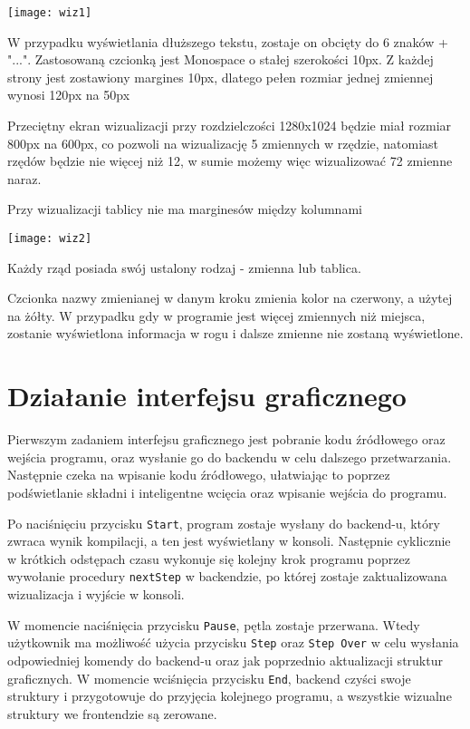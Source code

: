 \documentclass[a4paper,twoside,openright,11pt]{report}
\begin{document}
\begin{center}
  \texttt{[image: wiz1]}
\end{center}

\par W przypadku wyświetlania dłuższego tekstu, zostaje on obcięty do 6 znaków + "...".
Zastosowaną czcionką jest Monospace o stałej szerokości 10px. Z każdej strony jest zostawiony margines 10px, dlatego pełen rozmiar jednej zmiennej wynosi 120px na 50px 
\par Przeciętny ekran wizualizacji przy rozdzielczości 1280x1024 będzie miał rozmiar 800px na 600px, co pozwoli na wizualizację 5 zmiennych w rzędzie, natomiast rzędów będzie nie więcej niż 12, w sumie możemy więc wizualizować 72 zmienne naraz. 
\par Przy wizualizacji tablicy nie ma marginesów między kolumnami 

\begin{center}
  \texttt{[image: wiz2]}
\end{center}

\par Każdy rząd posiada swój ustalony rodzaj - zmienna lub tablica.
\par Czcionka nazwy zmienianej w danym kroku zmienia kolor na czerwony, a użytej na żółty. W przypadku gdy w programie jest więcej zmiennych niż miejsca, zostanie wyświetlona informacja w rogu i dalsze zmienne nie zostaną wyświetlone.

  \section{Działanie interfejsu graficznego}
\par Pierwszym zadaniem interfejsu graficznego jest pobranie kodu źródłowego oraz wejścia programu, oraz wysłanie go do backendu w celu dalszego przetwarzania. Następnie czeka na wpisanie kodu źródłowego, ułatwiając to poprzez podświetlanie składni i inteligentne wcięcia oraz wpisanie wejścia do programu. 
\par Po naciśnięciu przycisku \texttt{Start}, program zostaje wysłany do backend-u, który zwraca wynik kompilacji, a ten jest wyświetlany w konsoli. Następnie cyklicznie w krótkich odstępach czasu wykonuje się kolejny krok programu poprzez wywołanie procedury \texttt{nextStep} w backendzie, po której zostaje zaktualizowana wizualizacja i wyjście w konsoli.
\par W momencie naciśnięcia przycisku \texttt{Pause}, pętla zostaje przerwana. Wtedy użytkownik ma możliwość użycia przycisku \texttt{Step} oraz \texttt{Step Over} w celu wysłania odpowiedniej komendy do backend-u oraz jak poprzednio aktualizacji struktur graficznych. W momencie wciśnięcia przycisku \texttt{End}, backend czyści swoje struktury i przygotowuje do przyjęcia kolejnego programu, a wszystkie wizualne struktury we frontendzie są zerowane.
\end{document}

